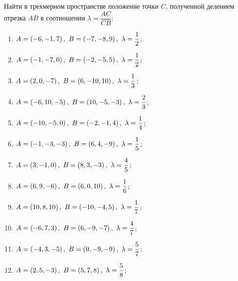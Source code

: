 	\vspace{15pt}
	Найти в трехмерном пространстве положение точки $C$, полученной делением отрезка $AB$ в соотношении $\lambda = \dfrac{AC}{CB}$:
	\begin{enumerate}
		\setcounter{enumi}{\value{tasks}}

		\item \( \displaystyle A = \left( -6, -1, 7 \right), ~ B = \left( -7, -8, 9 \right), ~ \lambda = \frac{1}{2} \);
		\item \( \displaystyle A = \left( -1, -7, 0 \right), ~ B = \left( -2, -5, 5 \right), ~ \lambda = \frac{1}{2} \);
		\item \( \displaystyle A = \left( 2, 0, -7 \right), ~ B = \left( 6, -10, 10 \right), ~ \lambda = \frac{1}{3} \);
		\item \( \displaystyle A = \left( -6, 10, -5 \right), ~ B = \left( 10, -5, -3 \right), ~ \lambda = \frac{2}{3} \);
		\item \( \displaystyle A = \left( -10, -5, 0 \right), ~ B = \left( -2, -1, 4 \right), ~ \lambda = \frac{1}{4} \);
		\item \( \displaystyle A = \left( -1, -3, -3 \right), ~ B = \left( 6, 4, -9 \right), ~ \lambda = \frac{1}{5} \);
		\item \( \displaystyle A = \left( 3, -1, 0 \right), ~ B = \left( 8, 3, -3 \right), ~ \lambda = \frac{4}{5} \);
		\item \( \displaystyle A = \left( 6, 9, -6 \right), ~ B = \left( 6, 0, 10 \right), ~ \lambda = \frac{1}{6} \);
		\item \( \displaystyle A = \left( 10, 8, 10 \right), ~ B = \left( -10, -4, 5 \right), ~ \lambda = \frac{1}{7} \);
		\item \( \displaystyle A = \left( -6, 7, 3 \right), ~ B = \left( 6, -9, -7 \right), ~ \lambda = \frac{4}{7} \);
		\item \( \displaystyle A = \left( -4, 3, -5 \right), ~ B = \left( 0, -9, -9 \right), ~ \lambda = \frac{5}{7} \);
		\item \( \displaystyle A = \left( 2, 5, -3 \right), ~ B = \left( 5, 7, 8 \right), ~ \lambda = \frac{5}{8} \);

		\setcounter{tasks}{\value{enumi}}
	\end{enumerate}	
